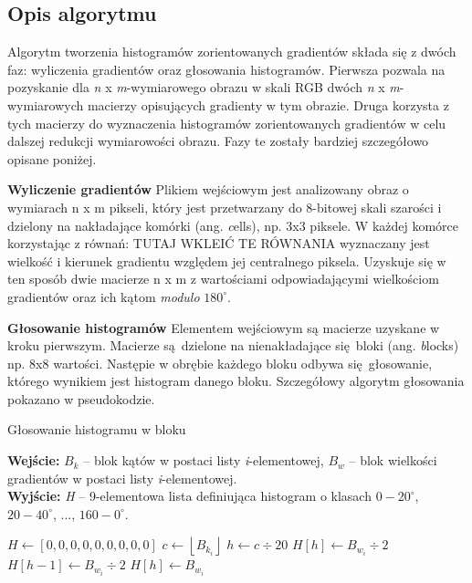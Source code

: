 \documentclass[12pt,a4paper,leqno,oneside,titlepage]{book}
\begin{document}
\subsection{Opis algorytmu}
Algorytm tworzenia histogramów zorientowanych gradientów składa się z dwóch faz: wyliczenia gradientów oraz głosowania histogramów. Pierwsza pozwala na pozyskanie dla \textit{n} x \textit{m}-wymiarowego obrazu w skali RGB dwóch \textit{n} x \textit{m}-wymiarowych macierzy opisujących gradienty w tym obrazie. Druga korzysta z tych macierzy do wyznaczenia histogramów zorientowanych gradientów w celu dalszej redukcji wymiarowości obrazu. Fazy te zostały bardziej szczegółowo opisane poniżej.

\textbf{Wyliczenie gradientów}
Plikiem wejściowym jest analizowany obraz o wymiarach n x m pikseli, który jest przetwarzany do 8-bitowej skali szarości i dzielony na nakładające komórki (ang. \textit cells), np. 3x3 piksele. W każdej komórce korzystając z równań: TUTAJ WKLEIĆ TE RÓWNANIA wyznaczany jest wielkość i kierunek gradientu względem jej centralnego piksela. Uzyskuje się w ten sposób dwie macierze n x m z wartościami odpowiadającymi wielkościom gradientów oraz ich kątom \textit{modulo} $180^\circ$.

\textbf{Głosowanie histogramów}
Elementem wejściowym są macierze uzyskane w kroku pierwszym. Macierze są dzielone na nienakładające się bloki (ang. \textit blocks) np. 8x8 wartości. Następie w obrębie każdego bloku odbywa się głosowanie, którego wynikiem jest histogram danego bloku. Szczegółowy algorytm głosowania pokazano w pseudokodzie.

\begin{algorithm}
\caption{Głosowanie histogramu w bloku}
\hspace*{\algorithmicindent} \textbf{Wejście:} $B_{k}$ -- blok kątów w postaci listy \textit{i}-elementowej, $B_w$ -- blok wielkości gradientów w postaci listy \textit{i}-elementowej. \\
\hspace*{\algorithmicindent} \textbf{Wyjście: } \textit{H} -- 9-elementowa lista definiująca histogram o klasach $0-20^{\circ}$, $20-40^{\circ}$, ..., $160-0^{\circ}.$ 

\begin{algorithmic}
\State $H\gets [0, 0, 0, 0, 0, 0, 0, 0, 0]$
  \State $c\gets \left\lfloor{B_{k_{i}}}\right\rfloor$
  \State $h\gets c\div 20$
    \State $H[h]\gets B_{w_{i}}\div 2$
    \State $H[h-1]\gets B_{w_{i}}\div 2$
  \Else
    \State $H[h]\gets B_{w_{i}}$
  \EndIf
\EndFor
\end{algorithmic}
\end{algorithm}
\end{document}
